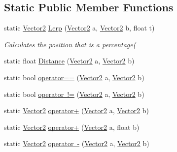 \subsection*{Static Public Member Functions}
\begin{DoxyCompactItemize}
\item 
static \mbox{\hyperlink{struct_retro_engine_1_1_vector2}{Vector2}} \mbox{\hyperlink{struct_retro_engine_1_1_vector2_aa04a6d619a9d18725824e045dc24d68d}{Lerp}} (\mbox{\hyperlink{struct_retro_engine_1_1_vector2}{Vector2}} a, \mbox{\hyperlink{struct_retro_engine_1_1_vector2}{Vector2}} b, float t)
\begin{DoxyCompactList}\small\item\em Calculates the position that is a percentage( \end{DoxyCompactList}\item 
static float \mbox{\hyperlink{struct_retro_engine_1_1_vector2_ab823ae5da3aa2fc238b480f33f5721fa}{Distance}} (\mbox{\hyperlink{struct_retro_engine_1_1_vector2}{Vector2}} a, \mbox{\hyperlink{struct_retro_engine_1_1_vector2}{Vector2}} b)
\item 
static bool \mbox{\hyperlink{struct_retro_engine_1_1_vector2_a0cd3f9bbe808dd1bf7cdf9dd198016d7}{operator==}} (\mbox{\hyperlink{struct_retro_engine_1_1_vector2}{Vector2}} a, \mbox{\hyperlink{struct_retro_engine_1_1_vector2}{Vector2}} b)
\item 
static bool \mbox{\hyperlink{struct_retro_engine_1_1_vector2_a680e68954ada939fc39715c1f51ae0f1}{operator !=}} (\mbox{\hyperlink{struct_retro_engine_1_1_vector2}{Vector2}} a, \mbox{\hyperlink{struct_retro_engine_1_1_vector2}{Vector2}} b)
\item 
static \mbox{\hyperlink{struct_retro_engine_1_1_vector2}{Vector2}} \mbox{\hyperlink{struct_retro_engine_1_1_vector2_a8f743a389148aa2580669a910e5d55dc}{operator+}} (\mbox{\hyperlink{struct_retro_engine_1_1_vector2}{Vector2}} a, \mbox{\hyperlink{struct_retro_engine_1_1_vector2}{Vector2}} b)
\item 
static \mbox{\hyperlink{struct_retro_engine_1_1_vector2}{Vector2}} \mbox{\hyperlink{struct_retro_engine_1_1_vector2_a61bd95d67d069695e6e58726d67b33c2}{operator+}} (\mbox{\hyperlink{struct_retro_engine_1_1_vector2}{Vector2}} a, float b)
\item 
static \mbox{\hyperlink{struct_retro_engine_1_1_vector2}{Vector2}} \mbox{\hyperlink{struct_retro_engine_1_1_vector2_afc0d9035f5f038221f9bbbec22d6960a}{operator -\/}} (\mbox{\hyperlink{struct_retro_engine_1_1_vector2}{Vector2}} a, \mbox{\hyperlink{struct_retro_engine_1_1_vector2}{Vector2}} b)

\end{DoxyCompactItemize}
